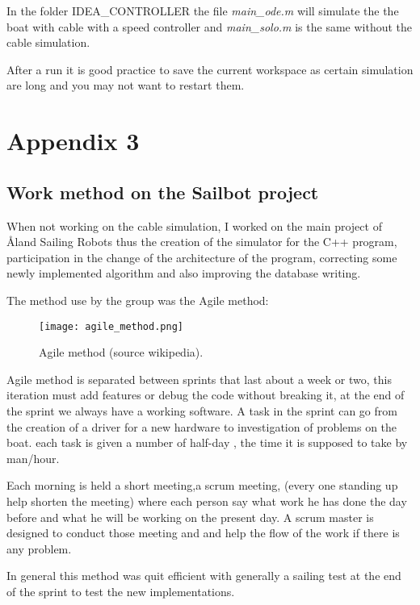 \documentclass[twoside,12pt]{report} %
\begin{document}
In the folder IDEA\_CONTROLLER the file \textit{main\_ode.m}  will simulate the the boat with cable with a speed controller and \textit{main\_solo.m} is the same without the cable simulation.

After a run it is good practice to save the current workspace as certain simulation are long and you may not want to restart them.



\chapter*{Appendix 3}

\section*{Work method on the Sailbot project}

When not working on the cable simulation, I worked on the main project of 
\r{A}land Sailing Robots thus the creation of the simulator for the C++ program, participation in the change of the architecture of the program, correcting some newly implemented  algorithm and also improving the database writing.

The method use by the group was the Agile method:
\begin{figure}[H]
\centering
    \texttt{[image: agile\_method.png]}
    \caption*{Agile method (source wikipedia).}
\end{figure}

Agile method is separated  between sprints that last about a week or two, this iteration must add features or debug the code without breaking it, at the end of the sprint we always have a working software. A task in the sprint can go from the creation of a driver for a new hardware to investigation of problems on the boat. each task is given a number of half-day , the time it is supposed to take by man/hour.

Each morning is held a short meeting,a scrum meeting, (every one standing up help shorten the meeting) where each person say what work he has done the day before and what he will be working on the present day. A scrum master is designed to conduct those meeting and and help the flow of the work if there is any problem.

In general this method was quit efficient with generally a sailing test at the end of the sprint to test the new implementations.
\end{document}
